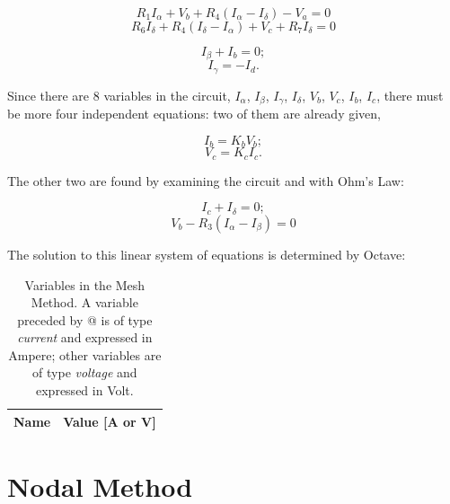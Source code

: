\begin{equation}
  R_1I_{\alpha} + V_b + R_4(I_{\alpha}-I_{\delta}) - V_a = 0
  \label{eq:MM_Alpha}
\end{equation}
\begin{equation}
  R_6I_{\delta} + R_4(I_{\delta}-I_{\alpha}) + V_c + R_7I_{\delta} = 0
  \label{eq:MM_Delta}
\end{equation}

\begin{equation}
  I_{\beta} + I_b = 0;
  \label{eq:MM_Beta}
\end{equation}
\begin{equation}
  I_{\gamma} = - I_d.
  \label{eq:MM_Gamma}
\end{equation}

Since there are 8 variables in the circuit, $I_{\alpha}$, $I_{\beta}$, $I_{\gamma}$, $I_{\delta}$, $V_b$, $V_c$, $I_b$, $I_c$, there must be more four independent equations: two of them are already given,

\begin{equation}
  I_b = K_bV_b;
  \label{eq:Vb_Ib}
\end{equation}
\begin{equation}
  V_c = K_cI_c.
  \label{eq:Vc_Ic}
\end{equation}

The other two are found by examining the circuit and with Ohm's Law:

\begin{equation}
  I_c + I_{\delta} = 0;
  \label{eq:MM_Ic}
\end{equation}
\begin{equation}
  V_b - R_3(I_{\alpha}-I_{\beta}) = 0
  \label{eq:MM_Vb}
\end{equation}

The solution to this linear system of equations is determined by Octave:

\begin{table}[h]
  \centering
  \begin{tabular}{|l|r|}
    \hline    
    {\bf Name} & {\bf Value [A or V]} \\ \hline
    
  \end{tabular}
  \caption{Variables in the Mesh Method. A variable preceded by @ is of type {\em current} and expressed in Ampere; other variables are of type {\em voltage} and expressed in Volt.}
  \label{tab:malhas}
\end{table}

\section{Nodal Method}

